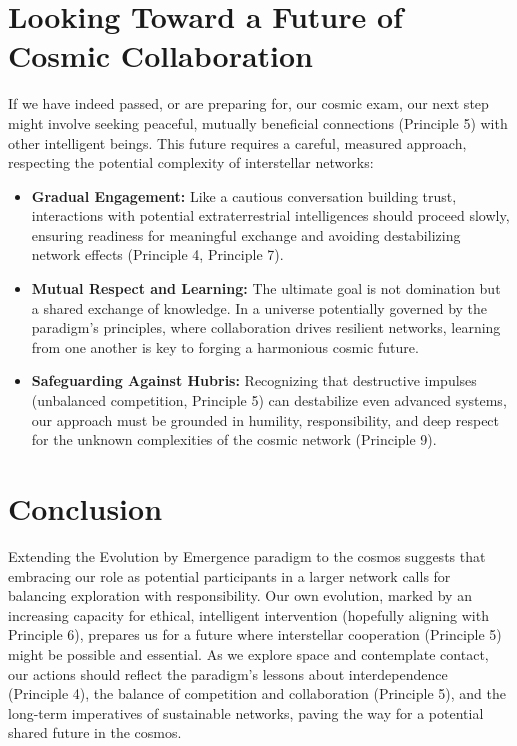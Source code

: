 \documentclass[12pt,openany]{book}
\let\cleardoublepage\clearpage %
\begin{document}
\section{Looking Toward a Future of Cosmic Collaboration}
If we have indeed passed, or are preparing for, our cosmic exam, our next step might involve seeking peaceful, mutually beneficial connections (Principle 5) with other intelligent beings. This future requires a careful, measured approach, respecting the potential complexity of interstellar networks:
\begin{itemize}
    \item \textbf{Gradual Engagement:} Like a cautious conversation building trust, interactions with potential extraterrestrial intelligences should proceed slowly, ensuring readiness for meaningful exchange and avoiding destabilizing network effects (Principle 4, Principle 7).
    \item \textbf{Mutual Respect and Learning:} The ultimate goal is not domination but a shared exchange of knowledge. In a universe potentially governed by the paradigm's principles, where collaboration drives resilient networks, learning from one another is key to forging a harmonious cosmic future.
    \item \textbf{Safeguarding Against Hubris:} Recognizing that destructive impulses (unbalanced competition, Principle 5) can destabilize even advanced systems, our approach must be grounded in humility, responsibility, and deep respect for the unknown complexities of the cosmic network (Principle 9).
\end{itemize} %

\section{Conclusion}
Extending the Evolution by Emergence paradigm to the cosmos suggests that embracing our role as potential participants in a larger network calls for balancing exploration with responsibility. Our own evolution, marked by an increasing capacity for ethical, intelligent intervention (hopefully aligning with Principle 6), prepares us for a future where interstellar cooperation (Principle 5) might be possible and essential. As we explore space and contemplate contact, our actions should reflect the paradigm's lessons about interdependence (Principle 4), the balance of competition and collaboration (Principle 5), and the long-term imperatives of sustainable networks, paving the way for a potential shared future in the cosmos. %
\cleardoublepage
\end{document}

